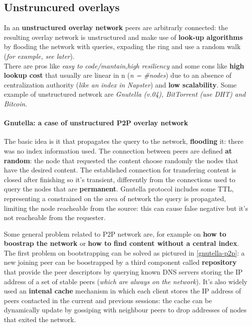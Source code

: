 \documentclass[10pt,a4paper]{report}
\begin{document}
\subsection{Unstruncured overlays}
\label{sec:unstruncured-overlays}
In an \textbf{unstructured overlay network} peers are arbitrarly connected: the resulting overlay network is unstructured and make use of \textbf{look-up algorithms} by flooding the network with queries, expading the ring and use a random walk (\textit{for example, see later}). \\
There are pros like \textit{easy to code/mantain},\textit{high resiliency} and some cons like \textbf{high lookup cost} that usually are linear in n (\textit{n = \#nodes})  due to an absence of centralization authority (\textit{like an index in Napster}) and \textbf{low scalability}.
Some example of unstructured network are \textit{Gnutella (v.04), BitTorrent (use DHT) and Bitcoin.}


\paragraph{Gnutella: a case of unstructured P2P overlay network}
\label{sec:gnutella-a-case-of-unstructured-p2p-overlay-network}
The basic idea is it that propagates the query to the network, \textbf{flooding} it: there was no index information used. The connection between peers are defined \textbf{at random}: the node that requested the content choose randomly the nodes that have the desired content. The established connection for transfering content is closed after finishing so it's transient, differently from the connections used to query the nodes that are \textbf{permanent}.
Gnutella protocol includes some TTL, representing a constrained on the area of network the query is propagated, limiting the node reacheable from the source: this can cause false negative but it's not reacheable from the requester.

Some general problem related to P2P network are, for example on \textbf{how to boostrap the network} or \textbf{how to find content without a central index}.
The first problem on bootstrapping can be solved as pictured in \ref{gnutella-p2p}:  a new joining peer can be boostrapped by a third component called \textbf{repository} that provide the peer descriptors by querying known DNS servers storing the IP address of a set of stable peers (\textit{which are always on the network}). It's also widely used an \textbf{intenal cache} mechanism in which each client stores the IP address of peers contacted in the current and previous sessions: the cache can be dynamically update by gossiping with neighbour peers to drop addresses of nodes that exited the network.
\end{document}
